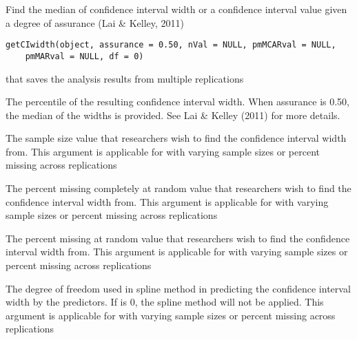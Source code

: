 \documentclass[a4paper]{book}
\begin{document}
%
\begin{Description}\relax
Find the median of confidence interval width or a confidence interval value given a degree of assurance (Lai \& Kelley, 2011)
\end{Description}
%
\begin{Usage}
\begin{verbatim}
getCIwidth(object, assurance = 0.50, nVal = NULL, pmMCARval = NULL, 
	pmMARval = NULL, df = 0)
\end{verbatim}
\end{Usage}
%
\begin{Arguments}
\begin{ldescription}
\item[\code{object}] 
 that saves the analysis results from multiple replications

\item[\code{assurance}] 
The percentile of the resulting confidence interval width. When assurance is 0.50, the median of the widths is provided. See Lai \& Kelley (2011) for more details.

\item[\code{nVal}] 
The sample size value that researchers wish to find the confidence interval width from. This argument is applicable for  with varying sample sizes or percent missing across replications

\item[\code{pmMCARval}] 
The percent missing completely at random value that researchers wish to find the confidence interval width from. This argument is applicable for  with varying sample sizes or percent missing across replications

\item[\code{pmMARval}] 
The percent missing at random value that researchers wish to find the confidence interval width from. This argument is applicable for  with varying sample sizes or percent missing across replications

\item[\code{df}] 
The degree of freedom used in spline method in predicting the confidence interval width by the predictors. If  is 0, the spline method will not be applied. This argument is applicable for  with varying sample sizes or percent missing across replications

\end{ldescription}
\end{Arguments}
\end{document}
